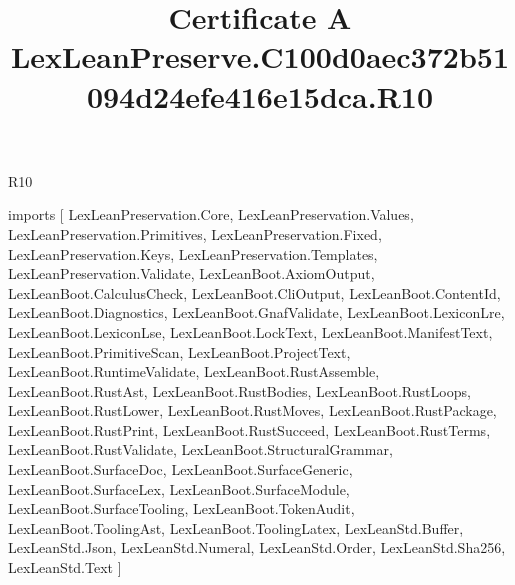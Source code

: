 \begin{lexlean}{R10}
\title{Certificate A LexLeanPreserve.C100d0aec372b51094d24efe416e15dca.R10}
\begin{coremodule}
imports [
  LexLeanPreservation.Core,
  LexLeanPreservation.Values,
  LexLeanPreservation.Primitives,
  LexLeanPreservation.Fixed,
  LexLeanPreservation.Keys,
  LexLeanPreservation.Templates,
  LexLeanPreservation.Validate,
  LexLeanBoot.AxiomOutput,
  LexLeanBoot.CalculusCheck,
  LexLeanBoot.CliOutput,
  LexLeanBoot.ContentId,
  LexLeanBoot.Diagnostics,
  LexLeanBoot.GnafValidate,
  LexLeanBoot.LexiconLre,
  LexLeanBoot.LexiconLse,
  LexLeanBoot.LockText,
  LexLeanBoot.ManifestText,
  LexLeanBoot.PrimitiveScan,
  LexLeanBoot.ProjectText,
  LexLeanBoot.RuntimeValidate,
  LexLeanBoot.RustAssemble,
  LexLeanBoot.RustAst,
  LexLeanBoot.RustBodies,
  LexLeanBoot.RustLoops,
  LexLeanBoot.RustLower,
  LexLeanBoot.RustMoves,
  LexLeanBoot.RustPackage,
  LexLeanBoot.RustPrint,
  LexLeanBoot.RustSucceed,
  LexLeanBoot.RustTerms,
  LexLeanBoot.RustValidate,
  LexLeanBoot.StructuralGrammar,
  LexLeanBoot.SurfaceDoc,
  LexLeanBoot.SurfaceGeneric,
  LexLeanBoot.SurfaceLex,
  LexLeanBoot.SurfaceModule,
  LexLeanBoot.SurfaceTooling,
  LexLeanBoot.TokenAudit,
  LexLeanBoot.ToolingAst,
  LexLeanBoot.ToolingLatex,
  LexLeanStd.Buffer,
  LexLeanStd.Json,
  LexLeanStd.Numeral,
  LexLeanStd.Order,
  LexLeanStd.Sha256,
  LexLeanStd.Text
]


\end{coremodule}
\end{lexlean}
